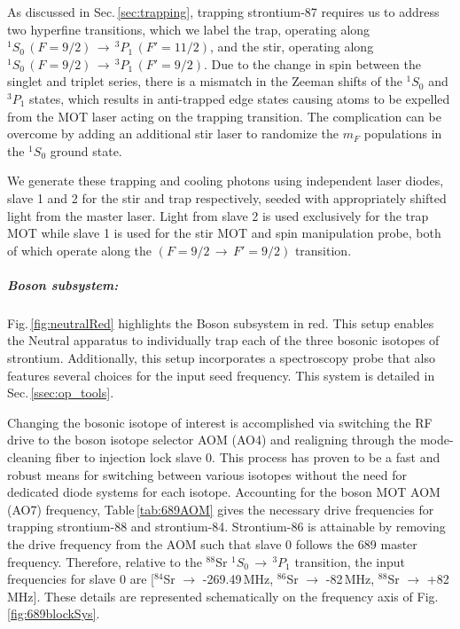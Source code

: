 As discussed in Sec.\,\ref{sec:trapping}, trapping strontium-87 requires us to address two hyperfine transitions, which we label the trap, operating along $^1S_0\,(F=9/2)\,\rightarrow\,^3P_1\,(F'=11/2)$, and the stir, operating along $^1S_0\,(F=9/2)\,\rightarrow\,^3P_1\,(F'=9/2)$.
Due to the change in spin between the singlet and triplet series, there is a mismatch in the Zeeman shifts of the $^1S_0$ and $^3P_1$ states, which results in anti-trapped edge states causing atoms to be expelled from the MOT laser acting on the trapping transition.
The complication can be overcome by adding an additional stir laser to randomize the $m_F$ populations in the $^1S_0$ ground state.

We generate these trapping and cooling photons using independent laser diodes, slave 1 and 2 for the stir and trap respectively, seeded with appropriately shifted light from the master laser.
Light from slave 2 is used exclusively for the trap MOT while slave 1 is used for the stir MOT and spin manipulation probe, both of which operate along the $(F=9/2\,\rightarrow\,F'=9/2)$ transition.

\subparagraph{Boson subsystem:}
Fig.\,\ref{fig:neutralRed} highlights the Boson subsystem in red.
This setup enables the Neutral apparatus to individually trap each of the three bosonic isotopes of strontium.
Additionally, this setup incorporates a spectroscopy probe that also features several choices for the input seed frequency. 
This system is detailed in Sec.\,\ref{ssec:op_tools}.

Changing the bosonic isotope of interest is accomplished via switching the RF drive to the boson isotope selector AOM (AO4) and realigning through the mode-cleaning fiber to injection lock slave 0.
This process has proven to be a fast and robust means for switching between various isotopes without the need for dedicated diode systems for each isotope.
Accounting for the boson MOT AOM (AO7) frequency, Table\,\ref{tab:689AOM} gives the necessary drive frequencies for trapping strontium-88 and strontium-84.
Strontium-86 is attainable by removing the drive frequency from the AOM such that slave 0 follows the 689 master frequency.
Therefore, relative to the $^{88}$Sr $^1S_0\,\rightarrow\,^3P_1$ transition, the input frequencies for slave 0 are [$^{84}$Sr $\rightarrow$ -269.49\,MHz, $^{86}$Sr $\rightarrow$ -82\,MHz, $^{88}$Sr $\rightarrow$ +82\,MHz].
These details are represented schematically on the frequency axis of Fig.\,\ref{fig:689blockSys}.
	
